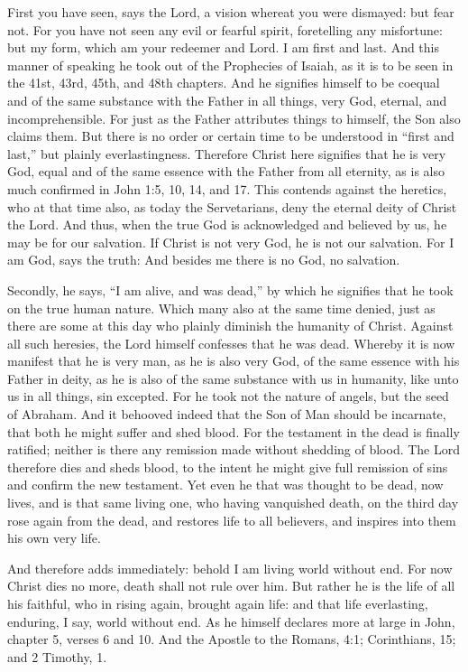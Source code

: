 First you have seen, says the Lord, a vision whereat you were dismayed: but fear not. For you have not seen any evil or fearful spirit, foretelling any misfortune: but my form, which am your redeemer and Lord. I am first and last. And this manner of speaking he took out of the Prophecies of Isaiah, as it is to be seen in the 41st, 43rd, 45th, and 48th chapters. And he signifies himself to be coequal and of the same substance with the Father in all things, very God, eternal, and incomprehensible. For just as the Father attributes things to himself, the Son also claims them. But there is no order or certain time to be understood in “first and last,” but plainly everlastingness. Therefore Christ here signifies that he is very God, equal and of the same essence with the Father from all eternity, as is also much confirmed in John 1:5, 10, 14, and 17. This contends against the heretics, who at that time also, as today the Servetarians, deny the eternal deity of Christ the Lord. And thus, when the true God is acknowledged and believed by us, he may be for our salvation. If Christ is not very God, he is not our salvation. For I am God, says the truth: And besides me there is no God, no salvation.

Secondly, he says, “I am alive, and was dead,” by which he signifies that he took on the true human nature. Which many also at the same time denied, just as there are some at this day who plainly diminish the humanity of Christ. Against all such heresies, the Lord himself confesses that he was dead. Whereby it is now manifest that he is very man, as he is also very God, of the same essence with his Father in deity, as he is also of the same substance with us in humanity, like unto us in all things, sin excepted. For he took not the nature of angels, but the seed of Abraham. And it behooved indeed that the Son of Man should be incarnate, that both he might suffer and shed blood. For the testament in the dead is finally ratified; neither is there any remission made without shedding of blood. The Lord therefore dies and sheds blood, to the intent he might give full remission of sins and confirm the new testament. Yet even he that was thought to be dead, now lives, and is that same living one, who having vanquished death, on the third day rose again from the dead, and restores life to all believers, and inspires into them his own very life.

And therefore adds immediately: behold I am living world without end. For now Christ dies no more, death shall not rule over him. But rather he is the life of all his faithful, who in rising again, brought again life: and that life everlasting, enduring, I say, world without end. As he himself declares more at large in John, chapter 5, verses 6 and 10. And the Apostle to the Romans, 4:1; Corinthians, 15; and 2 Timothy, 1.

